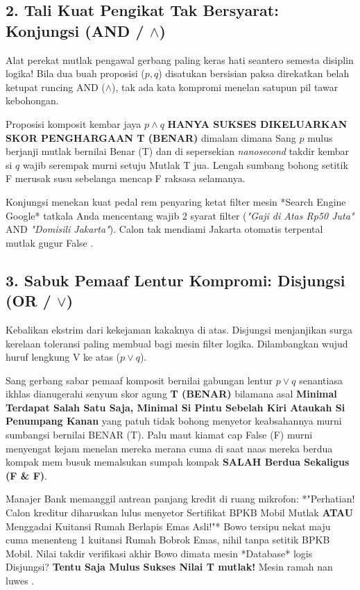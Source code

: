 \subsection{2. Tali Kuat Pengikat Tak Bersyarat: Konjungsi (AND / $\wedge$)}

Alat perekat mutlak pengawal gerbang paling keras hati seantero semesta disiplin logika! Bila dua buah proposisi ($p, q$) disatukan bersisian paksa direkatkan belah ketupat runcing AND ($\wedge$), tak ada kata kompromi menelan satupun pil tawar kebohongan.

\begin{definisi}
Proposisi komposit kembar jaya \textbf{$p \wedge q$} \textbf{HANYA SUKSES DIKELUARKAN SKOR PENGHARGAAN T (BENAR)} dimalam dimana Sang $p$ mulus berjanji mutlak bernilai Benar (T) dan di sepersekian \textit{nanosecond} takdir kembar si $q$ wajib serempak murni setuju Mutlak T jua. Lengah sumbang bohong setitik F merusak susu sebelanga mencap F raksasa selamanya.
\end{definisi}

Konjungsi menekan kuat pedal rem penyaring ketat filter mesin *Search Engine Google* tatkala Anda mencentang wajib 2 syarat filter (\textit{"Gaji di Atas Rp50 Juta"} AND \textit{"Domisili Jakarta"}). Calon tak mendiami Jakarta otomatis terpental mutlak gugur False \cite{wiki_first_order_logic}.

\subsection{3. Sabuk Pemaaf Lentur Kompromi: Disjungsi (OR / $\vee$)}

Kebalikan ekstrim dari kekejaman kakaknya di atas. Disjungsi menjanjikan surga kerelaan toleransi paling membual bagi mesin filter logika. Dilambangkan wujud huruf lengkung V ke atas ($p \vee q$).

\begin{definisi}
Sang gerbang sabar pemaaf komposit bernilai gabungan lentur \textbf{$p \vee q$} senantiasa ikhlas dianugerahi senyum skor agung \textbf{T (BENAR)} bilamana asal \textbf{Minimal Terdapat Salah Satu Saja, Minimal Si Pintu Sebelah Kiri Ataukah Si Penumpang Kanan}  yang patuh tidak bohong menyetor keabsahannya murni sumbangsi bernilai BENAR (T). Palu maut kiamat cap False (F) murni menyengat kejam menelan mereka merana cuma di saat naas mereka berdua kompak mem busuk memalsukan sumpah kompak \textbf{SALAH Berdua Sekaligus (F \& F)}.
\end{definisi}

Manajer Bank memanggil antrean panjang kredit di ruang mikrofon: *"Perhatian! Calon kreditur diharuskan lulus menyetor Sertifikat BPKB Mobil Mutlak \textbf{ATAU} Menggadai Kuitansi Rumah Berlapis Emas Asli!"* 
Bowo tersipu nekat maju cuma menenteng 1 kuitansi Rumah Bobrok Emas, nihil tanpa setitik BPKB Mobil. Nilai takdir verifikasi akhir Bowo dimata mesin *Database* logis Disjungsi? \textbf{Tentu Saja Mulus Sukses Nilai T mutlak!} Mesin ramah nan luwes \cite{wiki_first_order_logic}.
